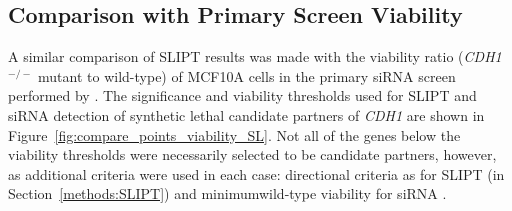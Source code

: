 \begin{table}[!htb]
\caption{\acrshort{ANOVA} for synthetic lethality and correlation with \textit{CDH1}}
\label{tab:compare_correlation_SL}
\noindent{}
\end{table} 

\FloatBarrier

\subsection{Comparison with Primary Screen Viability} \label{chapt3:compare_viability}

A similar comparison of \gls{SLIPT} results was made with the viability ratio (\textit{CDH1}$^{-/-}$ \gls{mutant} to \gls{wild-type}) of MCF10A cells in the primary \gls{siRNA} screen performed by \citet{Telford2015}. The significance and viability thresholds used for \gls{SLIPT} and \gls{siRNA} detection of \gls{synthetic lethal} candidate partners of \textit{CDH1} are shown in Figure~\ref{fig:compare_points_viability_SL}. Not all of the genes below the viability  thresholds were necessarily selected to be candidate partners, however, as additional criteria were used in each case: directional criteria as for \gls{SLIPT} (in Section~\ref{methods:SLIPT}) and minimum\gls{wild-type} viability for \gls{siRNA} \citep{Telford2015}.

